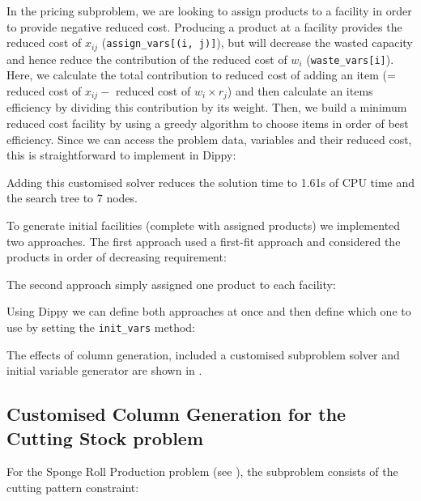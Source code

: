 In the pricing subproblem, we are looking to assign products to a facility in order to provide negative reduced cost. Producing a product at a facility provides the reduced cost of $x_{ij}$ (\texttt{assign\_vars[(i, j)]}), but will decrease the wasted capacity and hence reduce the contribution of the reduced cost of $w_i$ (\texttt{waste\_vars[i]}). Here, we calculate the total contribution to reduced cost of adding an item (= reduced cost of $x_{ij} -$ reduced cost of $w_i \times r_j$) and then calculate an items efficiency by dividing this contribution by its weight. Then, we build a minimum reduced cost facility by using a greedy algorithm to choose items in order of best efficiency. Since we can access the problem data, variables and their reduced cost, this is straightforward to implement in Dippy:


Adding this customised solver reduces the solution time to 1.61s of CPU time and the search tree to 7 nodes.

To generate initial facilities (complete with assigned products) we implemented two approaches. The first approach used a first-fit approach and considered the products in order of decreasing requirement:


The second approach simply assigned one product to each facility:


\newpage

Using Dippy we can define both approaches at once and then define which one to use by setting the \texttt{init\_vars} method:


The effects of column generation, included a customised subproblem solver and initial variable generator are shown in .

\subsection{Customised Column Generation for the Cutting Stock problem} \label{sbs:cut_cols}

For the Sponge Roll Production problem (see ), the subproblem consists of the cutting pattern constraint:


